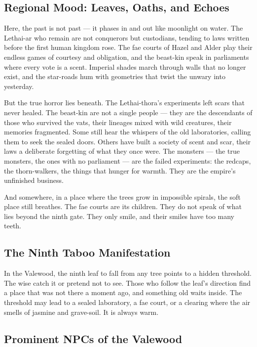 \subsection*{Regional Mood: Leaves, Oaths, and Echoes}

Here, the past is not past --- it phases in and out like moonlight on water. The Lethai-ar who remain are not conquerors but custodians, tending to laws written before the first human kingdom rose. The fae courts of Hazel and Alder play their endless games of courtesy and obligation, and the beast-kin speak in parliaments where every vote is a scent. Imperial shades march through walls that no longer exist, and the star-roads hum with geometries that twist the unwary into yesterday.

But the true horror lies beneath. The Lethai-thora's experiments left scars that never healed. The beast-kin are not a single people --- they are the descendants of those who survived the vats, their lineages mixed with wild creatures, their memories fragmented. Some still hear the whispers of the old laboratories, calling them to seek the sealed doors. Others have built a society of scent and scar, their laws a deliberate forgetting of what they once were. The monsters --- the true monsters, the ones with no parliament --- are the failed experiments: the redcaps, the thorn-walkers, the things that hunger for warmth. They are the empire's unfinished business.

And somewhere, in a place where the trees grow in impossible spirals, the soft place still breathes. The fae courts are its children. They do not speak of what lies beyond the ninth gate. They only smile, and their smiles have too many teeth.

\subsection*{The Ninth Taboo Manifestation}
\begin{tcolorbox}[colback=black!3,colframe=red!60!black,title=The Ninth Taboo,breakable]
In the Valewood, the ninth leaf to fall from any tree points to a hidden threshold. The wise catch it or pretend not to see. Those who follow the leaf's direction find a place that was not there a moment ago, and something old waits inside. The threshold may lead to a sealed laboratory, a fae court, or a clearing where the air smells of jasmine and grave-soil. It is always warm.
\end{tcolorbox}

\subsection*{Prominent NPCs of the Valewood}
\label{sec:valewood-npcs}

